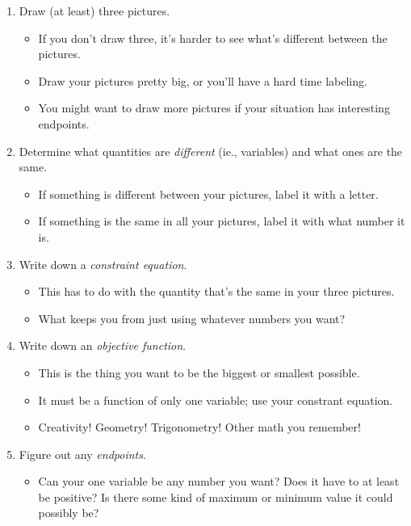 \begin{enumerate}[leftmargin=15pt]
    \item Draw (at least) three pictures.
    \begin{itemize}
        \item If you don't draw three, it's harder to see what's different between the pictures.
        \item Draw your pictures pretty big, or you'll have a hard time labeling.
        \item You might want to draw more pictures if your situation has interesting endpoints.
    \end{itemize}
    \item Determine what quantities are \textit{different} (ie., variables) and what ones are the same.
    \begin{itemize}
        \item If something is different between your pictures, label it with a letter.
        \item If something is the same in all your pictures, label it with what number it is.
    \end{itemize}
    \item Write down a \textit{constraint equation}.
    \begin{itemize}
        \item This has to do with the quantity that's the same in your three pictures.
        \item What keeps you from just using whatever numbers you want?
    \end{itemize}
    \item Write down an \textit{objective function}.
    \begin{itemize}
        \item This is the thing you want to be the biggest or smallest possible.
        \item It must be a function of only one variable; use your constrant equation.
        \item Creativity! Geometry! Trigonometry! Other math you remember!
    \end{itemize}
    \item Figure out any \textit{endpoints}.
    \begin{itemize}
        \item Can your one variable be any number you want? Does it have to at least be positive? Is there some kind of maximum or minimum value it could possibly be?
    \end{itemize}

\end{enumerate}

